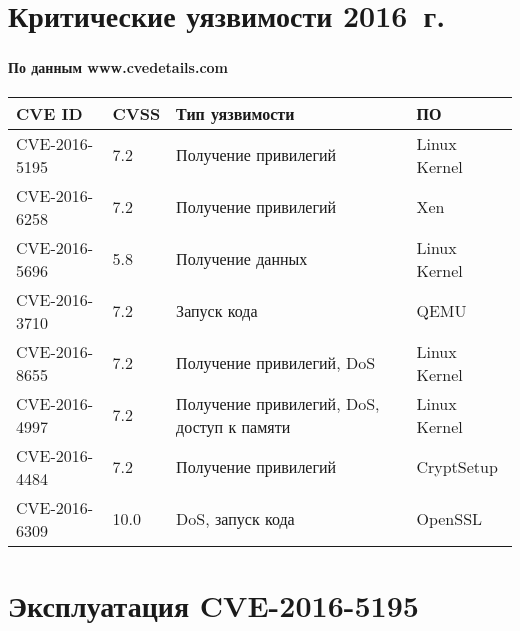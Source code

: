 
\section{Критические уязвимости 2016~г.}

\begin{frame}
\frametitle{\insertsection}
\framesubtitle{По данным www.cvedetails.com}

\begin{table}
    \begin{tabular}{|l|l|p{4cm}|l|}
        \hline \textbf{CVE ID} & \textbf{CVSS} & \textbf{Тип уязвимости} & \textbf{ПО} \\
        \hline CVE-2016-5195 & 7.2 & Получение привилегий & Linux Kernel \\
        \hline CVE-2016-6258 & 7.2 & Получение привилегий & Xen \\
        \hline CVE-2016-5696 & 5.8 & Получение данных & Linux Kernel \\
        \hline CVE-2016-3710 & 7.2 & Запуск кода & QEMU \\
        \hline CVE-2016-8655 & 7.2 & Получение привилегий, DoS & Linux Kernel \\
        \hline CVE-2016-4997 & 7.2 & Получение привилегий, DoS, доступ к памяти & Linux Kernel \\
        \hline CVE-2016-4484 & 7.2 & Получение привилегий & CryptSetup \\
        \hline CVE-2016-6309 & 10.0 & DoS, запуск кода & OpenSSL\\
        \hline
    \end{tabular}
\end{table}
\end{frame}


\section{Эксплуатация CVE-2016-5195}

